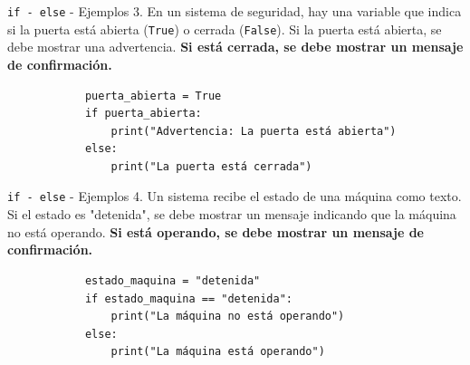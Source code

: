 \documentclass{beamer}
\begin{document}
    \begin{frame}[fragile,t]{\texttt{if - else} - Ejemplos}
        3. En un sistema de seguridad, hay una variable que indica si la puerta está 
        abierta (\texttt{True}) o cerrada (\texttt{False}). 
        Si la puerta está abierta, se debe mostrar una advertencia. \textbf{Si está cerrada, se debe 
        mostrar un mensaje de confirmación.}
        \begin{verbatim}
            puerta_abierta = True
            if puerta_abierta:
                print("Advertencia: La puerta está abierta")
            else:
                print("La puerta está cerrada")
        \end{verbatim}
    \end{frame}

    \begin{frame}[fragile,t]{\texttt{if - else} - Ejemplos}
        4. Un sistema recibe el estado de una máquina como texto. Si el estado es "detenida", 
        se debe mostrar un mensaje indicando que la máquina no está operando. \textbf{Si está operando, 
        se debe mostrar un mensaje de confirmación.}
        \begin{verbatim}
            estado_maquina = "detenida"
            if estado_maquina == "detenida":
                print("La máquina no está operando")
            else:
                print("La máquina está operando")
        \end{verbatim}
    \end{frame}

\end{document}
